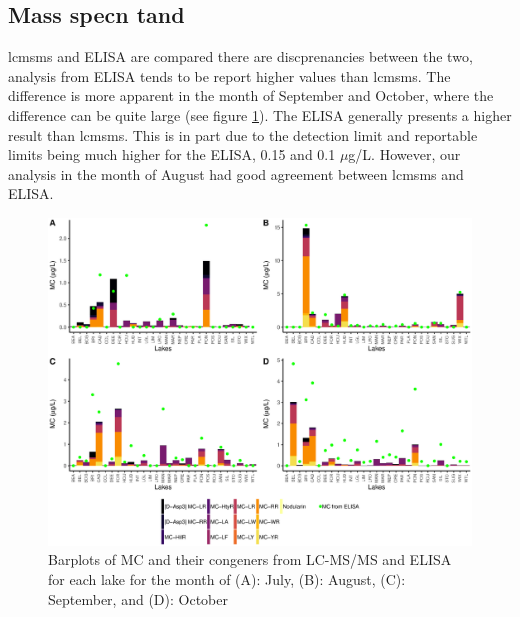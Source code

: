 \clearpage
\subsection[Comparison of Enzyme-linked Immunosorbent Assay and Liquid Chromatography/Mass-spectometry in Tandum]{\texorpdfstring{Mass spec}In tand}

\gls{lcmsms} and ELISA are compared there are discprenancies between the two, analysis from ELISA tends to be report higher values than \gls{lcmsms}. The difference is more apparent in the month of September and October, where the difference can be quite large (see figure \ref{fig:month}). The ELISA generally presents a higher result than \gls{lcmsms}. This is in part due to the detection limit and reportable limits being much higher for the ELISA, 0.15 and 0.1 $\mu$g/L. However, our analysis in the month of August had good agreement between \gls{lcmsms} and ELISA.  

\begin{figure} 
\includegraphics[width=\textwidth]{figures/month}
\caption{
Barplots of MC and their congeners from LC-MS/MS and ELISA  for each lake for the month of 
(A): July, 
(B): August,
(C): September, and
(D): October 
}
	\label{fig:month} 
\end{figure}




